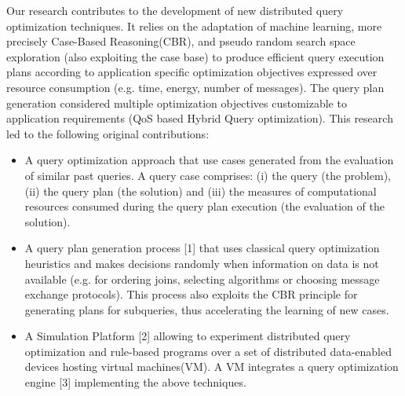 Our research contributes to the development of new distributed query optimization techniques. It relies on the adaptation of machine learning, more precisely Case-Based Reasoning(CBR), and pseudo random search space exploration (also exploiting the case base) to produce efficient  query execution plans according to application specific optimization objectives expressed over resource consumption (e.g. time, energy, number of messages).  The query plan generation considered multiple optimization objectives customizable to application requirements (QoS based Hybrid Query optimization).
This research led to the following original contributions:
\begin{itemize}
\item  A query optimization approach that use cases generated from the evaluation of similar past queries. A query case comprises: (i) the query (the problem), (ii) the query plan (the solution) and (iii) the measures of computational resources consumed during the query plan execution (the evaluation of the solution). 

\item  A query plan generation process [1] that uses classical query optimization heuristics and makes decisions randomly when information on data is not available (e.g. for ordering joins, selecting algorithms or choosing message exchange protocols). This process also exploits the CBR principle for generating plans for subqueries, thus accelerating the learning of new cases. 

\item  A Simulation Platform [2] allowing to experiment distributed query optimization and rule-based programs over a set of distributed data-enabled devices hosting virtual machines(VM). A VM integrates a query optimization engine [3] implementing the above techniques. 
\end{itemize}

